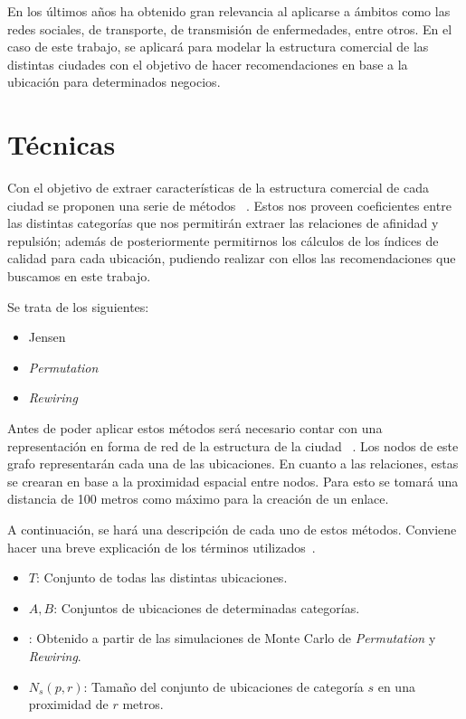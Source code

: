 En los últimos años ha obtenido gran relevancia al aplicarse a ámbitos como las redes sociales, de transporte, de transmisión de enfermedades, entre otros. En el caso de este trabajo, se aplicará para modelar la estructura comercial de las distintas ciudades con el objetivo de hacer recomendaciones en base a la ubicación para determinados negocios.


\section{Técnicas}
Con el objetivo de extraer características de la estructura comercial de cada ciudad se proponen una serie de métodos ~\cite{Ahedo2021,RSVAJSSHJG}. Estos nos proveen coeficientes entre las distintas categorías que nos permitirán extraer las relaciones de afinidad y repulsión; además de posteriormente permitirnos los cálculos de los índices de calidad para cada ubicación, pudiendo realizar con ellos las recomendaciones que buscamos en este trabajo.

Se trata de los siguientes:
\begin{itemize}
	\item Jensen
	\item \textit{Permutation}
	\item \textit{Rewiring}
\end{itemize}


Antes de poder aplicar estos métodos será necesario contar con una representación en forma de red de la estructura de la ciudad ~\cite{Ahedo2021,RSVAJSSHJG}. Los nodos de este grafo representarán cada una de las ubicaciones. En cuanto a las relaciones, estas se crearan en base a la proximidad espacial entre nodos. Para esto se tomará una distancia de 100 metros como máximo para la creación de un enlace.

A continuación, se hará una descripción de cada uno de estos métodos. Conviene hacer una
breve explicación de los términos utilizados~\cite{Ahedo2021,RSVAJSSHJG}.
\begin{itemize}
	\item $T$: Conjunto de todas las distintas ubicaciones.
	\item $A,B$: Conjuntos de ubicaciones de determinadas categorías.
	\item {}: Obtenido a partir de las simulaciones de Monte Carlo de \textit{Permutation} y \textit{Rewiring}.
	\item $N_s(p,r)$: Tamaño del conjunto de ubicaciones de categoría $s$ en una proximidad de $r$ metros.
\end{itemize}

